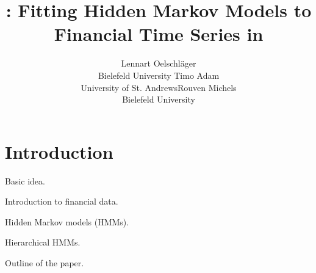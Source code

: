 \documentclass[article]{jss}
\author{Lennart Oelschl\"ager \\Bielefeld University \And Timo Adam \\University of St. Andrews\And Rouven Michels \\Bielefeld University}
\title{\pkg{fHMM}: Fitting Hidden Markov Models to Financial Time Series in \proglang{R}}
\newcommand{\fct}[1]{\code{#1()}}
\begin{document}



\section{Introduction}
\label{sec:intro}

Basic idea.

Introduction to financial data.

Hidden Markov models (HMMs).

Hierarchical HMMs.

Outline of the paper.


\end{document}
